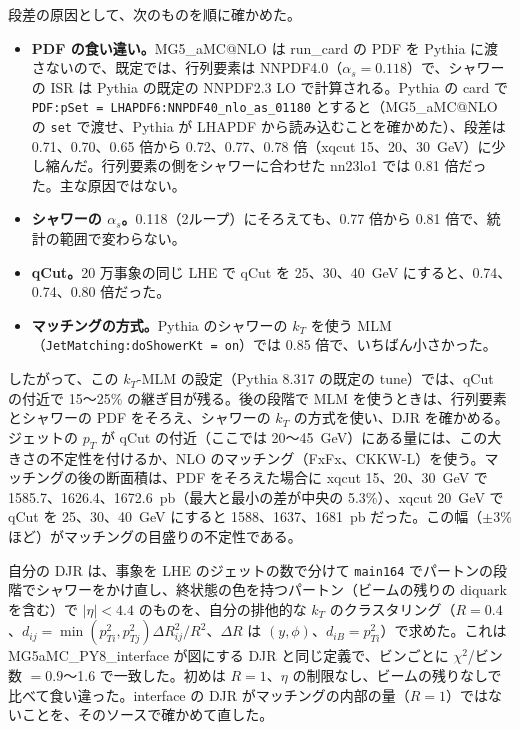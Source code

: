 \documentclass[a4paper,10pt]{ltjsarticle}
\makeatletter
\newcommand{\MGaMC}{MG5\_aMC@NLO}
\makeatother
\begin{document}
段差の原因として、次のものを順に確かめた。
\begin{itemize}
\item \textbf{PDF の食い違い。}\MGaMC{} は run\_card の PDF を Pythia に渡さないので、既定では、行列要素は NNPDF4.0（$\alpha_s=0.118$）で、シャワーの ISR は Pythia の既定の NNPDF2.3 LO で計算される。Pythia の card で \texttt{PDF:pSet = LHAPDF6:NNPDF40\_nlo\_as\_01180} とすると（\MGaMC{} の \texttt{set} で渡せ、Pythia が LHAPDF から読み込むことを確かめた）、段差は 0.71、0.70、0.65 倍から 0.72、0.77、0.78 倍（xqcut 15、20、30~GeV）に少し縮んだ。行列要素の側をシャワーに合わせた nn23lo1 では 0.81 倍だった。主な原因ではない。
\item \textbf{シャワーの $\alpha_s$。}0.118（2ループ）にそろえても、0.77 倍から 0.81 倍で、統計の範囲で変わらない。
\item \textbf{qCut。}20 万事象の同じ LHE で qCut を 25、30、40~GeV にすると、0.74、0.74、0.80 倍だった。
\item \textbf{マッチングの方式。}Pythia のシャワーの $k_T$ を使う MLM（\texttt{JetMatching:doShowerKt = on}）では 0.85 倍で、いちばん小さかった。
\end{itemize}
したがって、この $k_T$-MLM の設定（Pythia 8.317 の既定の tune）では、qCut の付近で 15〜25\% の継ぎ目が残る。後の段階で MLM を使うときは、行列要素とシャワーの PDF をそろえ、シャワーの $k_T$ の方式を使い、DJR を確かめる。ジェットの $p_T$ が qCut の付近（ここでは 20〜45~GeV）にある量には、この大きさの不定性を付けるか、NLO のマッチング（FxFx、CKKW-L）を使う。マッチングの後の断面積は、PDF をそろえた場合に xqcut 15、20、30~GeV で 1585.7、1626.4、1672.6~pb（最大と最小の差が中央の 5.3\%）、xqcut 20~GeV で qCut を 25、30、40~GeV にすると 1588、1637、1681~pb だった。この幅（$\pm3\%$ ほど）がマッチングの目盛りの不定性である。

自分の DJR は、事象を LHE のジェットの数で分けて \texttt{main164} でパートンの段階でシャワーをかけ直し、終状態の色を持つパートン（ビームの残りの diquark を含む）で $|\eta|<4.4$ のものを、自分の排他的な $k_T$ のクラスタリング（$R=0.4$、$d_{ij}=\min(p_{Ti}^2,p_{Tj}^2)\Delta R_{ij}^2/R^2$、$\Delta R$ は $(y,\phi)$、$d_{iB}=p_{Ti}^2$）で求めた。これは MG5aMC\_PY8\_interface が図にする DJR と同じ定義で、ビンごとに $\chi^2$/ビン数 $=0.9$〜1.6 で一致した。初めは $R=1$、$\eta$ の制限なし、ビームの残りなしで比べて食い違った。interface の DJR がマッチングの内部の量（$R=1$）ではないことを、そのソースで確かめて直した。
\end{document}
